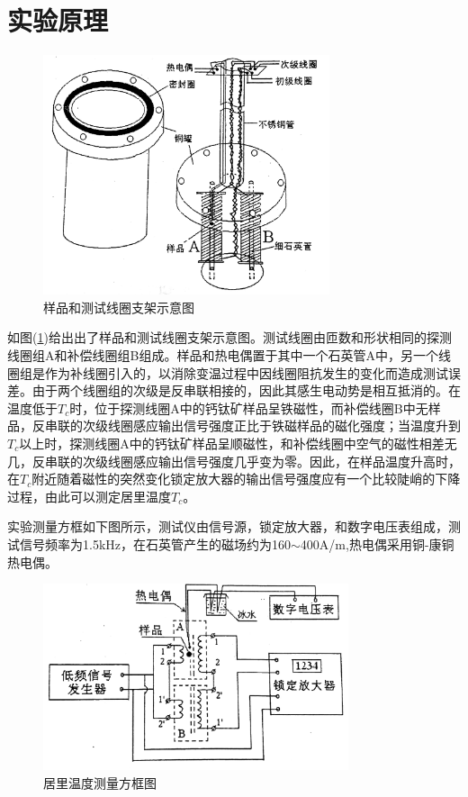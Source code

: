 \documentclass[a4paper]{article}
\begin{document}
\section{实验原理}
\begin{figure}[!h]
    \centering
    \includegraphics[width=0.75\textwidth]{fig/fig4.pdf}
    \caption{样品和测试线圈支架示意图}\label{fig4}
\end{figure}

如图(\ref{fig4})给出出了样品和测试线圈支架示意图。测试线圈由匝数和形状相同的探测线圈组A和补偿线圈组B组成。样品和热电偶置于其中一个石英管A中，另一个线圈组是作为补线圈引入的，以消除变温过程中因线圈阻抗发生的变化而造成测试误差。由于两个线圈组的次级是反串联相接的，因此其感生电动势是相互抵消的。在温度低于$T_c$时，位于探测线圈A中的钙钛矿样品呈铁磁性，而补偿线圈B中无样品，反串联的次级线圈感应输出信号强度正比于铁磁样品的磁化强度；当温度升到$T_c$以上时，探测线圈A中的钙钛矿样品呈顺磁性，和补偿线圈中空气的磁性相差无几，反串联的次级线圈感应输出信号强度几乎变为零。因此，在样品温度升高时，在$T_c$附近随着磁性的突然变化锁定放大器的输出信号强度应有一个比较陡峭的下降过程，由此可以测定居里温度$T_c$。

实验测量方框如下图所示，测试仪由信号源，锁定放大器，和数字电压表组成，测试信号频率为1.5kHz，在石英管产生的磁场约为160$\sim$400A/m,热电偶采用铜-康铜热电偶。
\begin{figure}[!h]
    \centering
    \includegraphics[width=0.8\textwidth]{fig/fig5.pdf}
    \caption{居里温度测量方框图}\label{fig5}
\end{figure}
\end{document}
